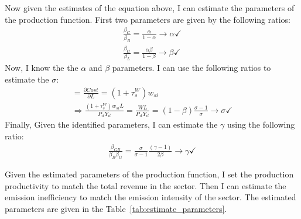 Now given the estimates of the equation above, I can estimate the parameters of the production function.  First two parameters are given by the following ratios:
\begin{gather*}
    \frac{\beta_G}{\beta_B} = \frac{\alpha}{1-\alpha} \rightarrow \alpha \checkmark\\
    \frac{\beta_G}{\beta_L} = \frac{\alpha \beta}{1-\beta} \rightarrow \beta \checkmark
\end{gather*}
Now, I know the the $\alpha$ and $\beta$ parameters. I can use the following ratios to estimate the $\sigma$:
\begin{equation*}
    \begin{split}
         = \frac{\partial Cost}{\partial L} = (1 + \tau^W_s)w_{si} \\
        \Rightarrow \frac{(1 + \tau^W_s)w_{si} L}{P_{it}Y_{it}} = \frac{W L}{P_{it}Y_{it}}= (1-\beta) \frac{\sigma-1}{\sigma} \rightarrow \sigma \checkmark
    \end{split}
\end{equation*}
Finally, Given the identified parameters, I can estimate the $\gamma$ using the following ratio:
\begin{gather*}
\frac{\beta_{GB}}{\beta_B\beta_G} = \frac{\sigma}{\sigma - 1}\frac{(\gamma-1)}{2\beta} \rightarrow \gamma \checkmark
\end{gather*}

Given the estimated parameters of the production function, I set the production productivity to match the total revenue in the sector. Then I can estimate the emission inefficiency to match the emission intensity of the sector. The estimated parameters are given in the Table~\ref{tab:estimate_parameters}.







